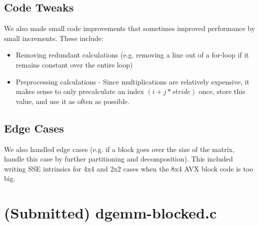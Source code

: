 \documentclass[12pt]{article}
\begin{document}
\subsection{Code Tweaks}
We also made small code improvements that sometimes improved performance by small increments. These include: 
\begin{itemize}
\item Removing redundant calculations (e.g. removing a line out of a for-loop if it remains constant over the entire loop)
\item Preprocessing calculations - Since multiplications are relatively expensive, it makes sense to only precalculate an index $(i +j* stride)$ once, store this value, and use it as often as possible. 
\end{itemize}

\subsection{Edge Cases}
We also handled edge cases (e.g. if a block goes over the size of the matrix, handle this case by further partitioning and decomposition). This included writing SSE intrinsics for 4x4 and 2x2 cases when the 8x4 AVX block code is too big. 

\section{(Submitted) dgemm-blocked.c }
\end{document}
